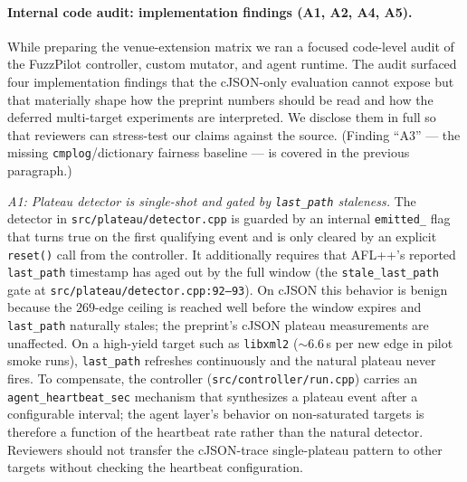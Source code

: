 \documentclass[11pt]{article}
\begin{document}
\paragraph{Internal code audit: implementation findings (A1, A2,
A4, A5).}
While preparing the venue-extension matrix we ran a focused
code-level audit of the FuzzPilot controller, custom mutator, and
agent runtime. The audit surfaced four implementation findings that
the cJSON-only evaluation cannot expose but that materially shape
how the preprint numbers should be read and how the deferred
multi-target experiments are interpreted. We disclose them in full
so that reviewers can stress-test our claims against the source.
(Finding ``A3'' --- the missing \texttt{cmplog}/dictionary fairness
baseline --- is covered in the previous paragraph.)

\emph{A1: Plateau detector is single-shot and gated by
\texttt{last\_path} staleness.}
The detector in
\texttt{src/plateau/detector.cpp} is guarded by an internal
\texttt{emitted\_} flag that turns true on the first qualifying
event and is only cleared by an explicit \texttt{reset()} call from
the controller. It additionally requires that AFL++'s reported
\texttt{last\_path} timestamp has aged out by the full window (the
\texttt{stale\_last\_path} gate at
\texttt{src/plateau/detector.cpp:92--93}). On cJSON this behavior
is benign because the $269$-edge ceiling is reached well before the
window expires and \texttt{last\_path} naturally stales; the
preprint's cJSON plateau measurements are unaffected. On a
high-yield target such as \texttt{libxml2} (${\sim}6.6$\,s per new
edge in pilot smoke runs), \texttt{last\_path} refreshes
continuously and the natural plateau never fires. To compensate, the
controller (\texttt{src/controller/run.cpp}) carries an
\texttt{agent\_heartbeat\_sec} mechanism that synthesizes a plateau
event after a configurable interval; the agent layer's behavior on
non-saturated targets is therefore a function of the heartbeat rate
rather than the natural detector. Reviewers should not transfer the
cJSON-trace single-plateau pattern to other targets without
checking the heartbeat configuration.
\end{document}
